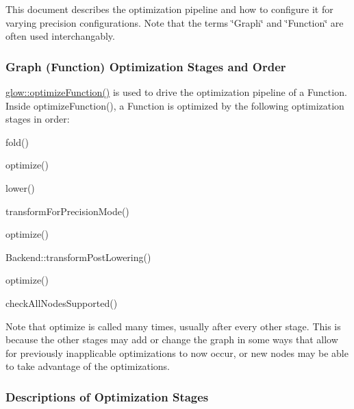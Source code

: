 This document describes the optimization pipeline and how to configure it for varying precision configurations. Note that the terms \char`\"{}\+Graph\char`\"{} and \char`\"{}\+Function\char`\"{} are often used interchangably.

\subsubsection*{Graph (Function) Optimization Stages and Order}

{\ttfamily \hyperlink{namespaceglow_af6b48e8310d02c29962b5469885b3a75}{glow\+::optimize\+Function()}} is used to drive the optimization pipeline of a Function. Inside {\ttfamily optimize\+Function()}, a Function is optimized by the following optimization stages in order\+:


\begin{DoxyItemize}
\item {\ttfamily fold()}
\item {\ttfamily optimize()}
\item {\ttfamily lower()}
\item {\ttfamily transform\+For\+Precision\+Mode()}
\item {\ttfamily optimize()}
\item {\ttfamily Backend\+::transform\+Post\+Lowering()}
\item {\ttfamily optimize()}
\item {\ttfamily check\+All\+Nodes\+Supported()}
\end{DoxyItemize}

Note that optimize is called many times, usually after every other stage. This is because the other stages may add or change the graph in some ways that allow for previously inapplicable optimizations to now occur, or new nodes may be able to take advantage of the optimizations.

\subsubsection*{Descriptions of Optimization Stages}


